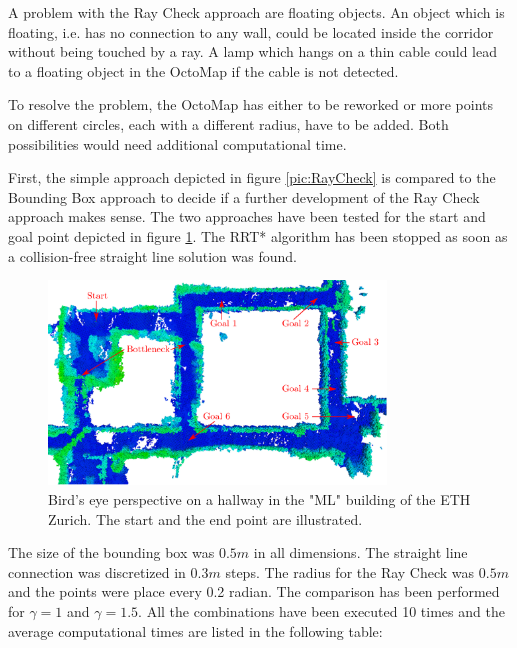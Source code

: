 A problem with the Ray Check approach are floating objects. An object which is floating, i.e. has no connection to any wall, could be located inside the corridor without being touched by a ray. A lamp which hangs on a thin cable could lead to a floating object in the OctoMap if the cable is not detected.\newline

To resolve the problem, the OctoMap has either to be reworked or more points on different circles, each with a different radius, have to be added. Both possibilities would need additional computational time. \newline

First, the simple approach depicted in figure \ref{pic:RayCheck} is compared to the Bounding Box approach to decide if a further development of the Ray Check approach makes sense.
The two approaches have been tested for the start and goal point depicted in figure \ref{pic:differentGoalRRT}. The RRT* algorithm has been stopped as soon as a collision-free straight line solution was found. 

\begin{figure}[H]
   \centering
   \includegraphics[trim = 0mm 86mm 94mm 0mm,clip,width=0.8\textwidth]{pics/ML4.eps}
   \caption{Bird's eye perspective on a hallway in the "ML" building of the ETH Zurich. The start and the end point are illustrated.}
   \label{pic:differentGoalRRT}
\end{figure}

The size of the bounding box was $0.5m$ in all dimensions. The straight line connection was discretized in $0.3m$ steps. The radius for the Ray Check was $0.5m$ and the points were place every 0.2 radian. The comparison has been performed for $\gamma = 1$ and $\gamma = 1.5$. All the combinations have been executed 10 times and the average computational times are listed in the following table:





